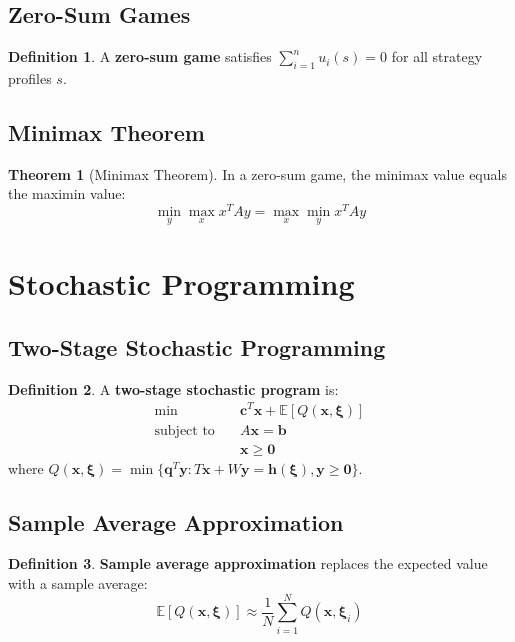 \documentclass[11pt]{article}
\theoremstyle{definition}
\newtheorem{definition}{Definition}[section]
\newtheorem{theorem}{Theorem}[section]
\begin{document}
\subsection{Zero-Sum Games}
\begin{definition}
A \textbf{zero-sum game} satisfies $\sum_{i=1}^n u_i(s) = 0$ for all strategy profiles $s$.
\end{definition}

\subsection{Minimax Theorem}
\begin{theorem}[Minimax Theorem]
In a zero-sum game, the minimax value equals the maximin value:
$$\min_{y} \max_{x} x^T A y = \max_{x} \min_{y} x^T A y$$
\end{theorem}

\section{Stochastic Programming}

\subsection{Two-Stage Stochastic Programming}
\begin{definition}
A \textbf{two-stage stochastic program} is:
\begin{align}
\min \quad & \mathbf{c}^T \mathbf{x} + \mathbb{E}[Q(\mathbf{x}, \boldsymbol{\xi})] \\
\text{subject to} \quad & A\mathbf{x} = \mathbf{b} \\
& \mathbf{x} \geq \mathbf{0}
\end{align}
where $Q(\mathbf{x}, \boldsymbol{\xi}) = \min\{\mathbf{q}^T \mathbf{y} : T\mathbf{x} + W\mathbf{y} = \mathbf{h}(\boldsymbol{\xi}), \mathbf{y} \geq \mathbf{0}\}$.
\end{definition}

\subsection{Sample Average Approximation}
\begin{definition}
\textbf{Sample average approximation} replaces the expected value with a sample average:
$$\mathbb{E}[Q(\mathbf{x}, \boldsymbol{\xi})] \approx \frac{1}{N} \sum_{i=1}^N Q(\mathbf{x}, \boldsymbol{\xi}_i)$$
\end{definition}
\end{document}
